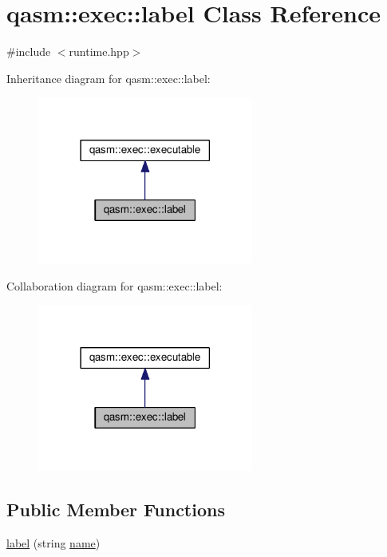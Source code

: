 \hypertarget{classqasm_1_1exec_1_1label}{}\section{qasm\+:\+:exec\+:\+:label Class Reference}
\label{classqasm_1_1exec_1_1label}


{\ttfamily \#include $<$runtime.\+hpp$>$}



Inheritance diagram for qasm\+:\+:exec\+:\+:label\+:\nopagebreak
\begin{figure}[H]
\begin{center}
\leavevmode
\includegraphics[width=201pt]{classqasm_1_1exec_1_1label__inherit__graph}
\end{center}
\end{figure}


Collaboration diagram for qasm\+:\+:exec\+:\+:label\+:\nopagebreak
\begin{figure}[H]
\begin{center}
\leavevmode
\includegraphics[width=201pt]{classqasm_1_1exec_1_1label__coll__graph}
\end{center}
\end{figure}
\subsection*{Public Member Functions}
\begin{DoxyCompactItemize}
\item 
\hyperlink{classqasm_1_1exec_1_1label_aea2a4500ead46240c26215b6d964fae4}{label} (string \hyperlink{classqasm_1_1exec_1_1label_ae88393dae0bd5ddbe32a65cfb2d8f247}{name})
\end{DoxyCompactItemize}
